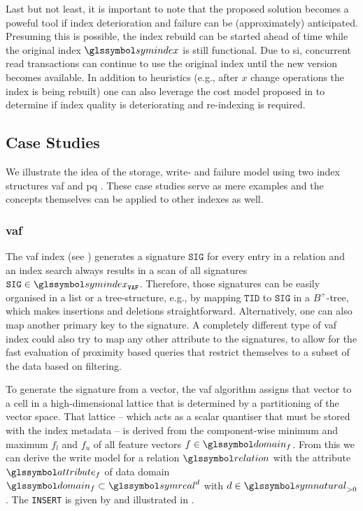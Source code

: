 Last but not least, it is important to note that the proposed solution becomes a poweful tool if index deterioration and failure can be (approximately) anticipated. Presuming this is possible, the index rebuild can be started ahead of time while the original index $\symindex$ is still functional. Due to \acrshort{si}, concurrent read transactions can continue to use the original index until the new version becomes available. In addition to heuristics (e.g., after $x$ change operations the index is being rebuilt) one can also leverage the cost model proposed in  to determine if index quality is deteriorating and re-indexing is required.

\subsection{Case Studies}

We illustrate the idea of the storage, write- and failure model using two index structures \acrshort{vaf} \cite{Weber:1998Va} and \acrshort{pq} \cite{Jegou:2010Product}. These case studies serve as mere examples and the concepts themselves can be applied to other indexes as well.

\subsubsection{\texorpdfstring{\acrfull{vaf}}{VAF}}

The \acrshort{vaf} index (see ) generates a signature $\mathtt{SIG}$ for every entry in a relation and an index search always results in a scan of all signatures $\mathtt{SIG} \in \symindex_{\mathtt{VAF}}$. Therefore, those signatures can be easily organised in a list or a tree-structure, e.g., by mapping $\mathtt{TID}$ to $\mathtt{SIG}$ in a $B^{+}$-tree, which makes insertions and deletions straightforward. Alternatively, one can also map another primary key to the signature. A completely different type of \acrshort{vaf} index could also try to map any other attribute to the signatures, to allow for the fast evaluation of proximity based queries that restrict themselves to a subset of the data based on filtering.

To generate the signature from a vector, the \acrshort{vaf} algorithm assigns that vector to a cell in a high-dimensional lattice that is determined by a partitioning of the vector space. That lattice -- which acts as a scalar quantiser that must be stored with the index metadata -- is derived from the component-wise minimum and maximum $f_{l}$ and $f_{u}$ of all feature vectors $f \in \domain_f$. From this we can derive the write model for a relation $\relation$ with the attribute $\attribute_f$ of data domain $\domain_f \subset \symreal^d$ with $d \in \symnatural_{>0}$. The \texttt{INSERT} is given by  and illustrated in .

